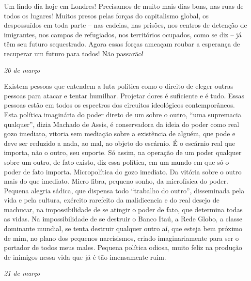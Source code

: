 Um lindo dia hoje em Londres! Precisamos de muito mais dias bons, nas
ruas de todos os lugares! Muitos presos pelas forças do capitalismo
global, os despossuídos em toda parte -- nas cadeias, nas prisões, nos
centros de detenção de imigrantes, nos campos de refugiados, nos
territórios ocupados, como se diz -- já têm seu futuro sequestrado. Agora
essas forças ameaçam roubar a esperança de recuperar um futuro para
todos! Não passarão!

\pagebreak

\begin{flushright}
\emph{20 de março}
\end{flushright}

Existem pessoas que entendem a luta política como o direito de eleger
outras pessoas para atacar e tentar humilhar. Projetar dores é
suficiente e é tudo. Essas pessoas estão em todos os espectros dos
circuitos ideológicos contemporâneos. Esta política imaginária do poder
direto de um sobre o outro, ``uma supremacia qualquer'', dizia Machado
de Assis, é conservadora da ideia do poder como real gozo imediato,
vitoria sem mediação sobre a existência de alguém, que pode e deve ser
reduzido a nada, ao mal, ao objeto do escárnio. É o escárnio real que
importa, não o outro, seu suporte. Só assim, na operação de um poder
qualquer sobre um outro, de fato existo, diz essa política, em um mundo
em que só o poder de fato importa. Micropolítica do gozo imediato. Da
vitória sobre o outro mais do que imediato. Micro fibra, pequeno sonho,
da microfísica do poder. Pequena alegria sádica, que dispensa todo
``trabalho do outro'', disseminada pela vida e pela cultura, exército
rarefeito da malidicencia e do real desejo de machucar, na
impossibilidade de se atingir o poder de fato, que determina todas as
vidas. Na impossibilidade de se destruir o Banco Itaú, a Rede Globo, a
classe dominante mundial, se tenta destruir qualquer outro aí, que
esteja bem próximo de mim, no plano dos pequenos narcisismos, criado
imaginariamente para ser o portador de todos meus males. Pequena
política odiosa, muito feliz na produção de inimigos nessa vida que já é
tão imensamente ruim.

\pagebreak

\begin{flushright}
\emph{21 de março}
\end{flushright}

